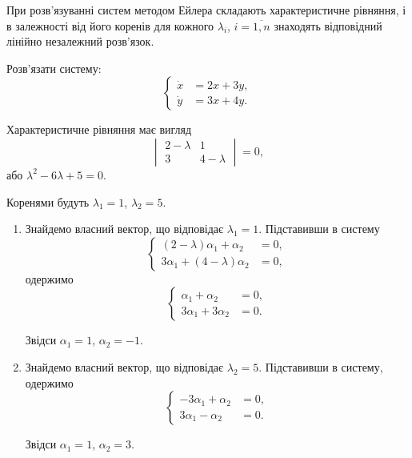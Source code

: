При розв'язуванні систем методом Ейлера складають характеристичне рівняння, і в залежності від його коренів для кожного $\lambda_i$,    $i = \overline{1, n}$ знаходять відповідний лінійно незалежний розв'язок.

\begin{example}
    Розв'язати систему:
    \[ \left\{ \begin{aligned}
        \dot x &= 2 x + 3 y, \\
        \dot y &= 3 x + 4 y.
    \end{aligned} \right. \]
\end{example}

\begin{solution}
    Характеристичне рівняння має вигляд
    \[ \begin{vmatrix}
        2 - \lambda & 1 \\
        3 & 4 - \lambda 
    \end{vmatrix} = 0, \]
    або $\lambda^2 - 6 \lambda + 5 = 0$. \parvskip
    
    Коренями будуть $\lambda_1 = 1$, $\lambda_2 = 5$.
    
    \begin{enumerate}
        \item Знайдемо власний вектор, що відповідає $\lambda_1 = 1$. Підставивши в систему
        \[ \left\{ \begin{aligned}
            (2 - \lambda) \alpha_1 + \alpha_2 &= 0, \\
            3 \alpha_1 + (4 - \lambda) \alpha_2 &= 0, 
        \end{aligned} \right. \]
        одержимо 
        \[ \left\{ \begin{aligned}
            \alpha_1 + \alpha_2 &= 0, \\
            3 \alpha_1 + 3 \alpha_2 &= 0.
        \end{aligned} \right. \]
        
        Звідси $\alpha_1 = 1$, $\alpha_2 = -1$.
        
        \item
        Знайдемо власний вектор, що відповідає $\lambda_2 = 5$. Підставивши в систему, одержимо
        \[ \left\{ \begin{aligned}
            - 3 \alpha_1 + \alpha_2 &= 0, \\
            3 \alpha_1 - \alpha_2 &= 0.
        \end{aligned} \right. \]
        
        Звідси $\alpha_1 = 1$, $\alpha_2 = 3$.
    \end{enumerate}
    

\end{solution}
